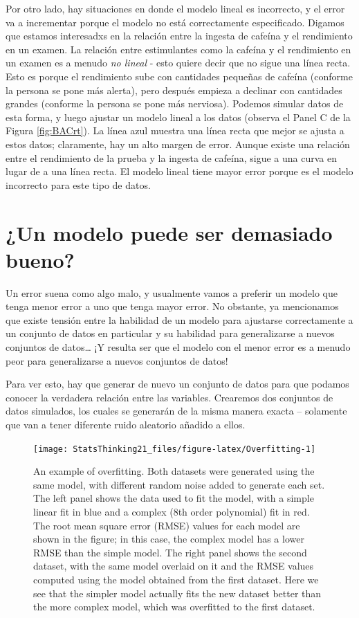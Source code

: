 \documentclass[
  12pt,
]{book}
\begin{document}
Por otro lado, hay situaciones en donde el modelo lineal es incorrecto, y el error va a incrementar porque el modelo no está correctamente especificado. Digamos que estamos interesadxs en la relación entre la ingesta de cafeína y el rendimiento en un examen. La relación entre estimulantes como la cafeína y el rendimiento en un examen es a menudo \emph{no lineal} - esto quiere decir que no sigue una línea recta. Esto es porque el rendimiento sube con cantidades pequeñas de cafeína (conforme la persona se pone más alerta), pero después empieza a declinar con cantidades grandes (conforme la persona se pone más nerviosa). Podemos simular datos de esta forma, y luego ajustar un modelo lineal a los datos (observa el Panel C de la Figura \ref{fig:BACrt}). La línea azul muestra una línea recta que mejor se ajusta a estos datos; claramente, hay un alto margen de error. Aunque existe una relación entre el rendimiento de la prueba y la ingesta de cafeína, sigue a una curva en lugar de a una línea recta. El modelo lineal tiene mayor error porque es el modelo incorrecto para este tipo de datos.

\hypertarget{overfitting}{%
\section{¿Un modelo puede ser demasiado bueno?}\label{overfitting}}

Un error suena como algo malo, y usualmente vamos a preferir un modelo que tenga menor error a uno que tenga mayor error. No obstante, ya mencionamos que existe tensión entre la habilidad de un modelo para ajustarse correctamente a un conjunto de datos en particular y su habilidad para generalizarse a nuevos conjuntos de datos\ldots{} ¡Y resulta ser que el modelo con el menor error es a menudo peor para generalizarse a nuevos conjuntos de datos!

Para ver esto, hay que generar de nuevo un conjunto de datos para que podamos conocer la verdadera relación entre las variables. Crearemos dos conjuntos de datos simulados, los cuales se generarán de la misma manera exacta -- solamente que van a tener diferente ruido aleatorio añadido a ellos.

\begin{figure}
\texttt{[image: StatsThinking21\_files/figure-latex/Overfitting-1]} \caption{An example of overfitting. Both datasets were generated using the same model, with different random noise added to generate each set.  The left panel shows the data used to fit the model, with a simple linear fit in blue and a complex (8th order polynomial) fit in red.  The root mean square error (RMSE) values for each model are shown in the figure; in this case, the complex model has a lower RMSE than the simple model.  The right panel shows the second dataset, with the same model overlaid on it and the RMSE values computed using the model obtained from the first dataset.  Here we see that the simpler model actually fits the new dataset better than the more complex model, which was overfitted to the first dataset.}\label{fig:Overfitting}
\end{figure}
\end{document}
